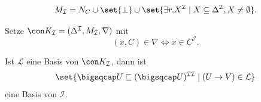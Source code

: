 \documentclass[ngerman]{beamer}
\newcommand{\pseudocite}[1]{\textcolor{gray}{[#1]}}
\begin{document}


\begin{frame}

  \onslide<+->

  \begin{Definition}
    \begin{equation*}
      M_{\mathcal{I}} = N_{C} \cup \set{ \bot } \cup \set{ \exists r. X^{\mathcal{I}} \mid
        X \subseteq \Delta^{\mathcal{I}}, X \neq \emptyset }.
    \end{equation*}
  \end{Definition}

  \onslide<+->

  \begin{Definition}
    Setze $\con K_{\mathcal{I}} = (\Delta^{\mathcal{I}}, M_{\mathcal{I}}, \nabla)$ mit
    \begin{equation*}
      (x, C) \in \nabla \iff x \in C^{\mathcal{I}}.
    \end{equation*}
  \end{Definition}

  \onslide<+->

  \begin{Satz}[\pseudocite{Baader, Distel 2009}]
    Ist $\mathcal{L}$ eine Basis von $\con K_{\mathcal{I}}$, dann ist
    \begin{equation*}
      \set{ \bigsqcap U \sqsubseteq (\bigsqcap U)^{\mathcal{I}\mathcal{I}} \mid (U \to V)
        \in \mathcal{L} }
    \end{equation*}
    eine Basis von $\mathcal{I}$.    
  \end{Satz}
  
\end{frame}
\end{document}

